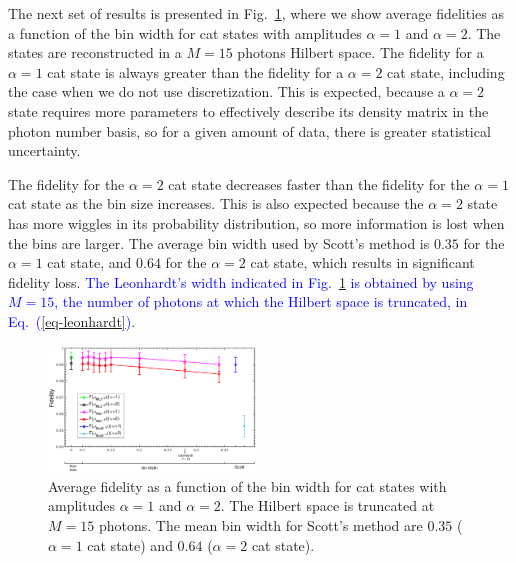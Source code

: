 \documentclass[
reprint,
superscriptaddress,
showpacs,
amsmath,
amssymb,
aps,
pra,
longbibliography
]{revtex4-1}
\providecommand{\editcolor}[2]{\textcolor{#1}{#2}}
\providecommand{\editcolor}[2]{#2}
\newcommand{\HV}[1]{\editcolor{blue}{#1}}
\begin{document}


The next set of results is presented in
Fig.~\ref{fig-fidelity_vs_binwidth_15_photons_catstate}, where we
show average fidelities as a function of the bin width for cat states 
with amplitudes $\alpha=1$ and $\alpha=2$. The states are reconstructed 
in a $M=15$ photons Hilbert space. The fidelity for a $\alpha=1$ cat state 
is always greater than the fidelity for a $\alpha=2$ cat state, including 
the case when we do not use discretization. This is expected, because a 
$\alpha = 2$ state requires more parameters to effectively describe its 
density matrix in the photon number basis, so for a given amount of data, 
there is greater statistical uncertainty. 

The fidelity for the $\alpha = 2$ cat state decreases faster than the fidelity for the $\alpha=1$ cat state as the bin size increases. This is also expected because the $\alpha = 2$ state has more wiggles in its probability distribution, so more information is lost when the bins are larger. The average bin width used by Scott's 
method is $0.35$ for the $\alpha=1$ cat state, and $0.64$ for the $\alpha=2$ 
cat state, which results in significant fidelity loss. \HV{The Leonhardt's width
indicated in Fig.~\ref{fig-fidelity_vs_binwidth_15_photons_catstate} is obtained 
by using $M=15$, the number of photons at which the Hilbert space is truncated, in Eq.~(\ref{eq-leonhardt}).}

\begin{figure}
  \includegraphics[width=0.49\textwidth]{catstate-alpha=1and2-15photons.eps}
  \caption{Average fidelity as a function of the bin width for
    cat states with amplitudes $\alpha=1$ and $\alpha=2$. The Hilbert
    space is truncated at $M=15$ photons. The mean bin width for Scott's
    method are $0.35$ ($\alpha=1$ cat state) and $0.64$ ($\alpha=2$
    cat state).}
  \label{fig-fidelity_vs_binwidth_15_photons_catstate}
\end{figure}
\end{document}
